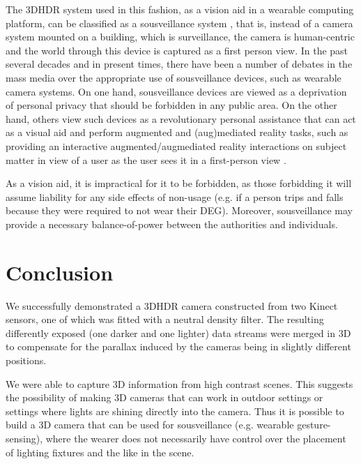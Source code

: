 The 3DHDR system used in this fashion, as a vision aid in a wearable computing platform, can be classified as a sousveillance system \cite{mann2004sousveillance,mann2006cyborglogging,mann2002sousveillance}, that is, instead of a camera system mounted on a building, which is surveillance, the camera is
human-centric and the world through this device is captured as a first person
view. In the past several decades and in present times, there have been
a number of debates in the mass media over the appropriate use of sousveillance
devices, such as wearable camera systems. On one hand, sousveillance devices are viewed as
a deprivation of personal privacy that should be forbidden in any public area.
On the other hand, others view such devices as a revolutionary personal
assistance that can act as a visual aid and perform augmented and (aug)mediated
reality \cite{hill2004reality} tasks, such as providing an interactive
augmented/augmediated reality interactions on subject matter in view of a
user as the user sees it in a first-person view \cite{aimone2003eyetap}.

As a vision aid, it is impractical for it to be forbidden, as those forbidding
it will assume liability for any side effects of non-usage (e.g. if a person
trips and falls because they were required to not wear their DEG).
Moreover, sousveillance may provide a necessary
balance-of-power between the authorities and individuals.

\section{Conclusion}
We successfully demonstrated a 3DHDR camera constructed from two
Kinect sensors, one of which was fitted with a neutral density filter.
The resulting differently exposed (one darker and one lighter) data streams
were merged in 3D to compensate for the parallax induced by the cameras
being in slightly different positions.

We were able to capture 3D information from high contrast scenes.
This suggests the possibility of making 3D cameras that can work in
outdoor settings or settings where lights are shining directly into
the camera. Thus it is possible to build a 3D camera that can be used for
sousveillance (e.g. wearable gesture-sensing), where the wearer does not
necessarily have control over the placement of lighting
fixtures and the like in the scene.

